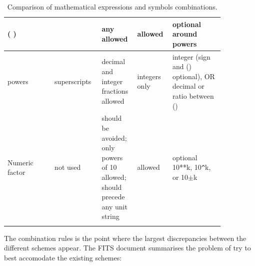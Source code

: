 \documentclass[12pt,notitlepage,onecolumn]{ivoa}
\begin{document}
\begin{longtable}[th]{|p{0.2\linewidth}|p{0.2\linewidth}|p{0.12\linewidth}|p{0.12\linewidth}|p{0.22\linewidth}|}
    ( ) &  & any allowed & allowed & optional around powers \\\hline\hline
    powers & superscripts & decimal and integer fractions allowed & integers only & integer (sign and () optional), OR decimal or ratio between () \\\hline
    Numeric factor & not used & should be avoided; only powers of 10 allowed; should precede any unit string & allowed & optional 10**k, 10\verb|^|k, or 10$\pm$k \\\hline\hline
  \caption{Comparison of mathematical expressions and symbols combinations.}
  \label{tab:comparUnitCombine}
\end{longtable}

The combination rules is the point where the largest discrepancies between the
different schemes appear. The FITS document summarises the problem of
try to best accomodate the existing schemes:
\label{sec:fitsquote}
\end{document}
